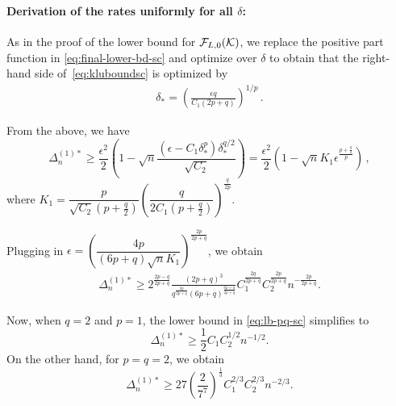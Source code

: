 \paragraph{Derivation of the rates uniformly for all $\delta$:}
As in the proof of the lower bound for $\mathcal{F}_{L,0}(\mathcal{K})$, we replace the positive part function in \eqref{eq:final-lower-bd-sc} and optimize over $\delta$ to obtain
that the right-hand side of~\eqref{eq:kluboundsc} is optimized by
\begin{align}
\delta_*=\left(\frac{ \epsilon q}{C_1(2p+q)}\right)^{1/p}\,.
\label{eq:deltastar-sc}
\end{align}

From the above, we have 
\[
\Delta_n^{(1)*} \ge \dfrac{\epsilon^2}{2} \left(1 - \sqrt{
    n}  \dfrac{ (\epsilon-C_1\delta_*^p)\delta_*^{q/2}}{\sqrt{C_2}}
  \right)= \dfrac{\epsilon^2}{2} \left(1 - \sqrt{n}  K_1 \epsilon^{\frac{p+\tfrac{q}{2}}{p}}\right)\,, 
\]
 where $K_1 = \dfrac{p}{\sqrt{C_2}(p+\tfrac{q}{2})} \left(\dfrac{q}{2C_1(p+\tfrac{q}{2})}\right)^{\frac{q}{2p}}$.

Plugging in $\epsilon = \left(\dfrac{4p}{(6p+q)\sqrt{n} K_1} \right)^{\frac{2p}{2p+q}}$, we obtain
\begin{align}
\Delta_n^{(1)*} \ge 2^{\frac{2p-q}{2p+q}} \frac{(2p+q)^3}{q^{\frac{2q}{2p+q}}(6p+q)^{\frac{6p+q}{2p+q}}}  C_1^{\frac{2q}{2p+q}}C_2^{\frac{2p}{2p+q}} n^{-\frac{2p}{2p+q}}.
\label{eq:lb-pq-sc}
\end{align}

Now, when $q=2$ and $p=1$, the lower bound in \eqref{eq:lb-pq-sc} simplifies to
\[
\Delta_n^{(1)*} \ge \frac{1}{2} C_1 C_2^{1/2} n^{-1/2}.
\]
On the other hand, for $p=q=2$, we obtain
\[
\Delta_n^{(1)*} \ge 27\left(\frac{2}{7^7}\right)^{\frac{1}{3}} C_1^{2/3}C_2^{2/3} n^{-2/3} .
\]



